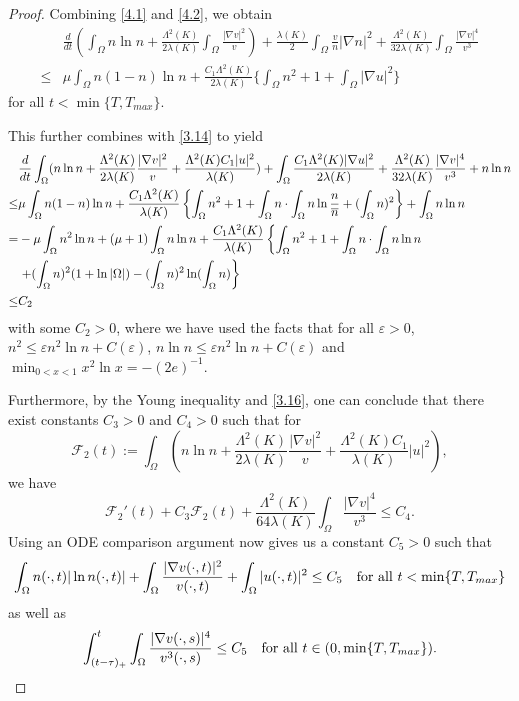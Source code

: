\documentclass[12pt]{article}
\theoremstyle{plain}
\theoremstyle{definition}
\numberwithin{equation}{section}
\begin{document}
\begin{proof}[Proof]
 Combining \eqref{4.1} and \eqref{4.2}, we obtain
  \begin{equation}\label{4.6}
\begin{split}
&\frac d{dt} (\int_\Omega n\ln n+
\frac{\Lambda^2(K)}{2\lambda(K)}\int_\Omega  \frac{|\nabla v|^2}v)+
\frac{\lambda(K)} 2\int_\Omega\frac{v}{n}|\nabla n|^2+
\frac{\Lambda^2(K)}{32\lambda(K)}
\int_\Omega \frac{|\nabla v|^4}{v^3}
\\
\leq &
\mu \int_\Omega n(1-n)\ln n+ \frac{C_1\Lambda^2(K)}{2\lambda(K)}\{\int_\Omega n^2+1+
\int_\Omega  |\nabla u|^2\}
\end{split}
\end{equation}
for all  $t<\min\{T,T_{max}\}$.

 This further combines with \eqref{3.14} to yield
\begin{align}\label{4.7}
&\frac d{dt} \int_\Omega (n\ln n+
\frac{\Lambda^2(K)}{2\lambda(K)} \frac{|\nabla v|^2}v
+\frac{\Lambda^2(K)C_1|u|^2}{\lambda(K)}
)+\int_\Omega\frac{C_1\Lambda^2(K)|\nabla u|^2}{2\lambda(K)}+
\frac{\Lambda^2(K)}{32\lambda(K)}
 \frac{|\nabla v|^4}{v^3} + n\ln n \notag
\\
\leq &
\mu \int_\Omega n(1-n)\ln n+ \frac{C_1\Lambda^2(K)}{\lambda(K)}\left\{\int_\Omega n^2+1+
\int_\Omega n \cdot\int_\Omega n\ln\frac n{\overline n}+(\int_\Omega n)^2\right\}+\int_\Omega n\ln n \notag\\
=&
-\mu \int_\Omega n^2\ln n+(\mu+1) \int_\Omega n\ln n+
 \frac{C_1\Lambda^2(K)}{\lambda(K)}\left\{\int_\Omega n^2+1+
\int_\Omega n \cdot\int_\Omega n\ln n\right. \notag\\
&\left.
+(\int_\Omega n)^2(1+\ln |\Omega|)- (\int_\Omega n)^2\ln(\int_\Omega n )\right\}\\
\leq &C_2 \notag
\end{align}
 with some $C_2>0$, where we have used the facts that for all $\varepsilon>0$,  $n^2\leq \varepsilon n^2\ln n +C(\varepsilon)$,
 $n\ln n\leq \varepsilon n^2\ln n +C(\varepsilon)$ and $\displaystyle\min_{0<x<1}x^2\ln x=-(2e)^{-1}$.

Furthermore, by the Young inequality and  \eqref{3.16}, one can conclude that
there exist constants $C_3>0$ and $C_4>0$ such that for
$$\mathcal{F}_2(t):=   \int_\Omega (n\ln n+
\frac{\Lambda^2(K)}{2\lambda(K)} \frac{|\nabla v|^2}v
+\frac{\Lambda^2(K)C_1}{\lambda(K)}|u|^2
),
$$
we have
$$
\mathcal{F}_2'(t)+C_3 \mathcal{F}_2(t)+ \frac{\Lambda^2(K)}{64\lambda(K)}
 \int_\Omega \frac{|\nabla v|^4}{v^3}\leq C_4.
$$
Using an ODE comparison argument now gives us a constant $C_5>0$ such that
$$
\int_\Omega n(\cdot,t)|\ln n(\cdot,t)|+\int_\Omega  \frac{|\nabla v(\cdot,t)|^2}{v(\cdot,t)}+\int_\Omega |u(\cdot,t)|^2\leq C_5
\quad \hbox{for all}\,  \,t<\min\{T,T_{max}\}
$$
as well as
$$
 \int^{t}_{(t-\tau)_+} \int_\Omega  \frac{|\nabla v(\cdot,s)|^4}{v^3(\cdot,s)} \leq C_5
\quad \hbox{for all}\,  \,t\in (0,\min\{T,T_{max}\}).
$$
\end{proof}
\end{document}
